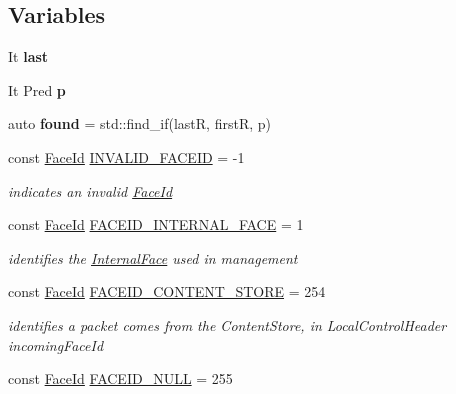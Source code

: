 \subsection*{Variables}
\begin{DoxyCompactItemize}
\item 
It {\bfseries last}\hypertarget{namespacenfd_a24473a4fabf4d9429aef762a51f0252f}{}\label{namespacenfd_a24473a4fabf4d9429aef762a51f0252f}

\item 
It Pred {\bfseries p}
\item 
auto {\bfseries found} = std\+::find\+\_\+if(lastR, firstR, p)\hypertarget{namespacenfd_a5a09536dfcda7838d8c4ae08feaf6935}{}\label{namespacenfd_a5a09536dfcda7838d8c4ae08feaf6935}

\item 
const \hyperlink{classFaceId}{Face\+Id} \hyperlink{namespacenfd_add3dcf2a398b2ec04344096562dc5c51}{I\+N\+V\+A\+L\+I\+D\+\_\+\+F\+A\+C\+E\+ID} = -\/1\hypertarget{namespacenfd_add3dcf2a398b2ec04344096562dc5c51}{}\label{namespacenfd_add3dcf2a398b2ec04344096562dc5c51}

\begin{DoxyCompactList}\small\item\em indicates an invalid \hyperlink{classFaceId}{Face\+Id} \end{DoxyCompactList}\item 
const \hyperlink{classFaceId}{Face\+Id} \hyperlink{namespacenfd_ae9e4c42998bd5305ad469b5806109ba0}{F\+A\+C\+E\+I\+D\+\_\+\+I\+N\+T\+E\+R\+N\+A\+L\+\_\+\+F\+A\+CE} = 1\hypertarget{namespacenfd_ae9e4c42998bd5305ad469b5806109ba0}{}\label{namespacenfd_ae9e4c42998bd5305ad469b5806109ba0}

\begin{DoxyCompactList}\small\item\em identifies the \hyperlink{classnfd_1_1InternalFace}{Internal\+Face} used in management \end{DoxyCompactList}\item 
const \hyperlink{classFaceId}{Face\+Id} \hyperlink{namespacenfd_a16844b23338760074f9f493bee89869a}{F\+A\+C\+E\+I\+D\+\_\+\+C\+O\+N\+T\+E\+N\+T\+\_\+\+S\+T\+O\+RE} = 254\hypertarget{namespacenfd_a16844b23338760074f9f493bee89869a}{}\label{namespacenfd_a16844b23338760074f9f493bee89869a}

\begin{DoxyCompactList}\small\item\em identifies a packet comes from the Content\+Store, in Local\+Control\+Header incoming\+Face\+Id \end{DoxyCompactList}\item 
const \hyperlink{classFaceId}{Face\+Id} \hyperlink{namespacenfd_a5e89cf32cfa9e2ed6e6c6b5fe507aa39}{F\+A\+C\+E\+I\+D\+\_\+\+N\+U\+LL} = 255\hypertarget{namespacenfd_a5e89cf32cfa9e2ed6e6c6b5fe507aa39}{}\label{namespacenfd_a5e89cf32cfa9e2ed6e6c6b5fe507aa39}


\end{DoxyCompactItemize}

